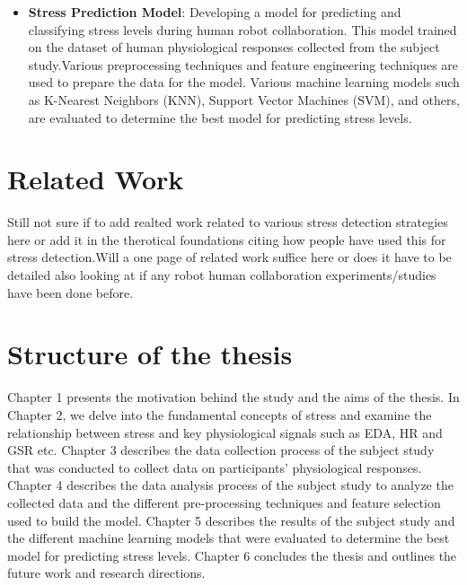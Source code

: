 \begin{itemize}
	\item \textbf{Stress Prediction Model}: Developing a model for predicting and classifying stress levels during human robot collaboration. This model  trained on the dataset of human physiological responses collected from the subject study.Various preprocessing techniques and feature engineering techniques are used to prepare the data for the model.
	Various machine learning models such as K-Nearest Neighbors (KNN), Support Vector Machines (SVM), and others, are evaluated to determine the best model for predicting stress levels.
  \end{itemize}

\section{Related Work}
Still not sure if to add realted work related to various  stress detection strategies here or add it in the therotical foundations citing how people have used this for stress detection.Will a one page of related work suffice here or does  it have to be detailed also looking at if any robot human collaboration experiments/studies have been done before.

\section{Structure of the thesis}
  Chapter 1 presents the motivation behind the study and the aims of the thesis. In Chapter 2, we delve into the fundamental concepts of stress and examine the relationship between stress and key physiological signals such as \gls{EDA}, \gls{HR} and \gls{GSR} etc. Chapter 3 describes the data collection process of the subject study that was conducted to collect data on participants' physiological responses. Chapter 4 describes the data analysis process of the subject study  to analyze the collected data and the different pre-processing techniques and feature selection used to build the model. Chapter 5 describes the results of the subject study and the different machine learning models that were evaluated to determine the best model for predicting stress levels. Chapter 6 concludes the thesis and outlines the future work and research directions.
  

  
 
 